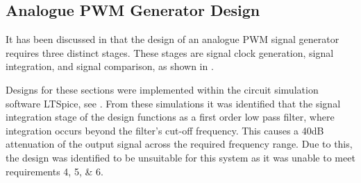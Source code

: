 \subsection{Analogue PWM Generator Design}\label{S:PWM_analogue_design}

It has been discussed in  that the design of an analogue PWM signal generator requires three distinct stages. These stages are signal clock generation, signal integration, and signal comparison, as shown in .

Designs for these sections were implemented within the circuit simulation software LTSpice, see . From these simulations it was identified that the signal integration stage of the design functions as a first order low pass filter, where integration occurs beyond the filter's cut-off frequency. This causes a 40dB attenuation of the output signal across the required frequency range. Due to this, the design was identified to be unsuitable for this system as it was unable to meet requirements 4, 5, \& 6. 





